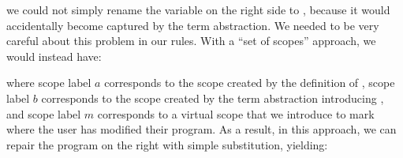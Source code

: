 \noindent%
%
we could not simply rename the variable  on the right side to
, because it would accidentally become captured by the term
abstraction.  We needed to be very careful about this problem in our rules.
With a ``set of scopes'' approach, we would instead have:

\begin{figure*}[htp]
\noindent
\cprotect{}%
\cprotect{}%
\end{figure*}

\noindent%
%
where scope label $a$ corresponds to the scope created by the definition of
, scope label $b$ corresponds to the scope created by the term
abstraction introducing , and scope label $m$ corresponds to a
virtual scope that we introduce to mark where the user has modified their
program.  As a result, in this approach, we can repair the program on the right
with simple substitution, yielding:

\begin{figure*}[htp]
\noindent
\cprotect{}%
\cprotect{}%
\end{figure*}

